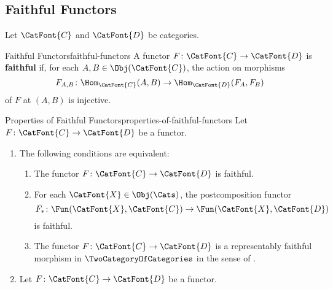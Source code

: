 \subsection{Faithful Functors}\label{subsection-faithful-functors}
Let $\CatFont{C}$ and $\CatFont{D}$ be categories.
\begin{definition}{Faithful Functors}{faithful-functors}%
    A functor $F\colon\CatFont{C}\to\CatFont{D}$ is \textbf{faithful} if, for each $A,B\in\Obj(\CatFont{C})$, the action on morphisms
    \[
        F_{A,B}
        \colon
        \Hom_{\CatFont{C}}(A,B)
        \to
        \Hom_{\CatFont{D}}(F_{A},F_{B})
    \]%
    of $F$ at $(A,B)$ is injective.
\end{definition}
\begin{proposition}{Properties of Faithful Functors}{properties-of-faithful-functors}%
    Let $F\colon\CatFont{C}\to\CatFont{D}$ be a functor.
    \begin{enumerate}
        \item\label{properties-of-faithful-functors-interaction-with-postcomposition}The following conditions are equivalent:
            \begin{enumerate}
                \item\label{properties-of-faithful-functors-interaction-with-postcomposition-a}The functor $F\colon\CatFont{C}\to\CatFont{D}$ is faithful.
                \item\label{properties-of-faithful-functors-interaction-with-postcomposition-b}For each $\CatFont{X}\in\Obj(\Cats)$, the postcomposition functor
                    \[
                        F_{*}
                        \colon
                        \Fun(\CatFont{X},\CatFont{C})
                        \to
                        \Fun(\CatFont{X},\CatFont{D})
                    \]%
                    is faithful.
                \item\label{properties-of-faithful-functors-interaction-with-postcomposition-c}The functor $F\colon\CatFont{C}\to\CatFont{D}$ is a representably faithful morphism in $\TwoCategoryOfCategories$ in the sense of .
            \end{enumerate}
        \item\label{properties-of-faithful-functors-interaction-with-precomposition-1}Let $F\colon\CatFont{C}\to\CatFont{D}$ be a functor.

\end{enumerate}
\end{proposition}
